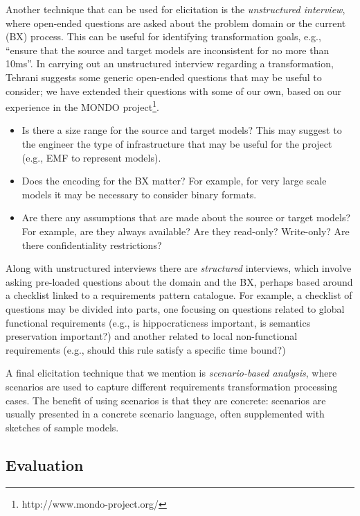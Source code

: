 Another technique that can be used for elicitation is the \textit{unstructured interview}, where open-ended questions are asked about the problem domain or the current (BX) process. This can be useful for identifying transformation goals, e.g., ``ensure that the source and target models are inconsistent for no more than 10ms''. In carrying out an unstructured interview regarding a transformation, Tehrani \cite{TehraniZL16} suggests some generic open-ended questions that may be useful to consider; we have extended their questions with some of our own, based on our experience in the MONDO project\footnote{http://www.mondo-project.org/}.
\begin{itemize}
\item Is there a size range for the source and target models? This may suggest to the engineer the type of infrastructure that may be useful for the project (e.g., EMF to represent models).

\item Does the encoding for the BX matter? For example, for very large scale models it may be necessary to consider binary formats.

\item Are there any assumptions that are made about the source or target models? For example, are they always available? Are they read-only? Write-only? Are there confidentiality restrictions?
\end{itemize}
Along with unstructured interviews there are \textit{structured} interviews, which involve asking pre-loaded questions about the domain and the BX, perhaps based around a checklist linked to a requirements pattern catalogue. For example, a checklist of questions may be divided into parts, one focusing on questions related to global functional requirements (e.g., is hippocraticness important, is semantics preservation important?) and another related to local non-functional requirements (e.g., should this rule satisfy a specific time bound?)

A final elicitation technique that we mention is \textit{scenario-based analysis}, where scenarios are used to capture different requirements transformation processing cases. The benefit of using scenarios is that they are concrete: scenarios are usually presented in a concrete scenario language, often supplemented with sketches of sample models. 

\subsection{Evaluation}



